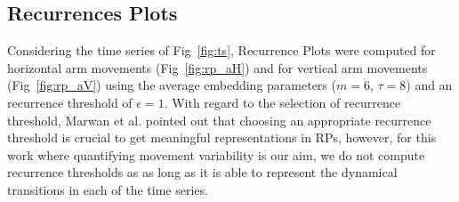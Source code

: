 \documentclass[fleqn,10pt]{wlscirep}
\begin{document}
\subsection*{Recurrences Plots}
Considering the time series of Fig~\ref{fig:ts}, 
Recurrence Plots were computed for horizontal arm movements (Fig~\ref{fig:rp_aH}) and
for vertical arm movements (Fig~\ref{fig:rp_aV}) 
using the average embedding parameters ($m=6$, $\tau=8$) 
and an recurrence threshold of $\epsilon=1$.
With regard to the selection of recurrence threshold,
Marwan et al. \cite{marwan2011} pointed out that choosing an appropriate 
recurrence threshold is crucial to get meaningful representations in RPs, 
however, for this work where quantifying movement variability is our aim,
we do not compute recurrence thresholds as as long as it is able to 
represent the dynamical transitions in each of the time series.
\end{document}
